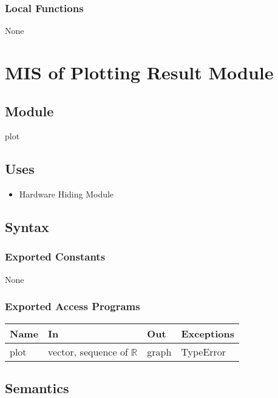 \documentclass[12pt, titlepage]{article}
\begin{document}
\subsubsection{Local Functions}

None
\newpage
\section{MIS of Plotting Result Module} \label{Plotting_Result_Module} 

\subsection{Module}

plot

\subsection{Uses}

\begin{itemize}
    \item Hardware Hiding Module
\end{itemize}

\subsection{Syntax}

\subsubsection{Exported Constants}

None

\subsubsection{Exported Access Programs}

\begin{center}
\begin{tabular}{p{2cm} p{4cm} p{4cm} p{2cm}}
\hline
\textbf{Name} & \textbf{In} & \textbf{Out} & \textbf{Exceptions} \\
\hline
plot & vector, sequence of $\mathbb{R}$ & graph & TypeError  \\
\hline
\end{tabular}
\end{center}

\subsection{Semantics}
\end{document}
